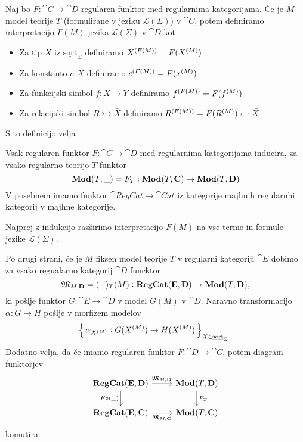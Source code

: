 \documentclass[../kategoricna_logika.tex]{subfiles}
\begin{document}
\begin{definicija}
  Naj bo $F : \cat{C} \to \cat{D}$ regularen funktor med regularnima kategorijama.
  Če je $M$ model teorije $T$ (formulirane v jeziku $\mathcal{L}(\Sigma)$) v $\cat{C}$,
  potem definiramo interpretacijo $F(M)$ jezika $\mathcal{L}(\Sigma)$ v $\cat{D}$ kot
  \begin{itemize}
    \item Za tip $X$ iz $\underline{\mathrm{sort}}_\Sigma$ definiramo $\interp[F(M)]{X} = F(\interp{X})$
    \item Za konstanto $c:X$ definiramo $\interp[F(M)]{c} = F(\interp{x})$
    \item Za funkcijski simbol $f : \bar{X} \to Y$ definiramo $\interp[F(M)]{f} = F(\interp{f})$
    \item Za relacijski simbol $R \rightarrowtail \bar{X}$ definiramo $\interp[F(M)]{R} = F(\interp{R}) \rightarrowtail \bar{X}$
  \end{itemize}
\end{definicija}
S to definicijo velja
\begin{lema}\label{lema:regularen-funktor-slika-model-v-model}
  Vsak regularen funktor $F : \cat{C} \to \cat{D}$ med regularnima kategorijama inducira,
  za vsako regularno teorijo $T$ funktor
  $$\Mod(T, \_)=F_T : \Mod(T,\cat{C}) \to \Mod(T, \cat{D})$$
  V posebnem imamo funktor $\cat{RegCat} \to \cat{Cat}$ iz kategorije majhnih regularnhi kategorij v majhne kategorije.
\end{lema}
\begin{dokaz}
  Najprej z indukcijo razširimo interpretacijo $F(M)$ na vse terme in formule jezike $\mathcal{L}(\Sigma)$.
\end{dokaz}
Po drugi strani, če je $M$ fiksen model teorije $T$ v regularni kategoriji $\cat{E}$
dobimo za vsako regualarno kategorij $\cat{D}$ funcktor
$$\mathfrak{M}_{M,\cat{D}} = (\_)_T(M): \cat{RegCat}(\cat{E}, \cat{D}) \to \Mod(T, \cat{D}),$$
ki pošlje funktor $G : \cat{E} \to \cat{D}$ v model $G(M)$ v $\cat{D}$.
Naravno transformacijo $\alpha : G \to H$ pošlje v morfizem modelov
$$\set{\alpha_{\interp{X}}: G(\interp{X}) \to H(\interp{X})}_{X \in \underline{\mathrm{sort}}_{\Sigma}}.$$
Dodatno velja, da če imamo regularen funktor $F : \cat{D} \to \cat{C}$, potem diagram funktorjev
\begin{equation}
  \begin{tikzcd}
    \cat{RegCat}(\cat{E}, \cat{D}) \ar[d, "F \circ (\_)"'] \ar[r, "\mathfrak{M}_{M,\cat{D}}"] & \Mod(T, \cat{D}) \ar[d, "F_T"] \\
    \cat{RegCat}(\cat{E}, \cat{C}) \ar[r, "\mathfrak{M}_{M,\cat{C}}"'] & \Mod(T, \cat{C})
  \end{tikzcd}
\end{equation}
komutira.
\end{document}
